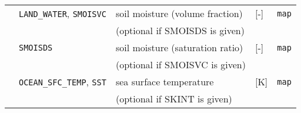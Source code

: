 {\begin{table}[bth]
\begin{center}
\begin{tabularx}{150mm}{rl|l|l|X}
           &\verb|LAND_WATER|, \verb|SMOISVC| & soil moisture (volume fraction)  & [-]            & \verb|map|         \\
           &               & (optional if SMOISDS is given)   &                &                    \\
           &\verb|SMOISDS| & soil moisture (saturation ratio) & [-]            & \verb|map|         \\
           &               & (optional if SMOISVC is given)   &                &                    \\
           &\verb|OCEAN_SFC_TEMP|, \verb|SST|     & sea surface temperature          & [K]            & \verb|map|         \\
           &               & (optional if SKINT is given)     &                &                    \\\hline
\end{tabularx}
\end{center}
\end{table}
}
